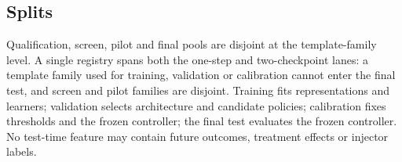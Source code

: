 \subsection{Splits}

Qualification, screen, pilot and final pools are disjoint at the template-family
level.  A single registry spans both the one-step and two-checkpoint lanes: a
template family used for training, validation or calibration cannot enter the
final test, and screen and pilot families are disjoint.  Training fits
representations and learners; validation selects architecture and candidate
policies; calibration fixes thresholds and the frozen controller; the final test
evaluates the frozen controller.  No test-time feature may contain future
outcomes, treatment effects or injector labels.

